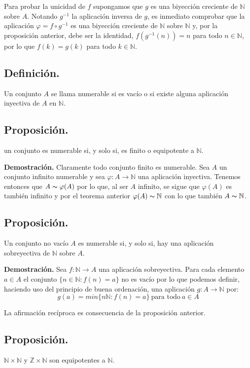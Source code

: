 \documentclass[10pt,a4paper]{article}
\begin{document}
	Para probar la unicidad de $f$ supongamos que $g$ es una biyección creciente de $\mathbb{N}$ sobre $A$. Notando $g^{-1}$ la aplicación inversa de $g$, es inmediato comprobar que la aplicación $\varphi = f \circ g^{-1}$ es una biyección creciente de $\mathbb{N}$ sobre $\mathbb{N}$ y, por la proposición anterior, debe ser la identidad, $f(g^{-1}(n)) = n$ para todo $n \in \mathbb{N}$, por lo que $f(k) = g(k)$ para todo $k \in \mathbb{N}$.
	
	\subsection{Definición.}
	Un conjunto $A$ se llama numerable si es vacío o si existe alguna aplicación inyectiva de $A$ en $\mathbb{N}$.
	
	\subsection{Proposición.}
	un conjunto es numerable si, y solo si, es finito o equipotente a $\mathbb{N}$.
	
	\textbf{Demostración.} Claramente todo conjunto finito es numerable. Sea $A$ un conjunto infinito numerable y sea $\varphi: A \rightarrow \mathbb{N}$ una aplicación inyectiva. Tenemos entonces que $A \thicksim \varphi(A)$ por lo que, al ser $A$ infinito, se sigue que $\varphi(A)$ es también infinito y por el teorema anterior $\varphi(A) \thicksim \mathbb{N}$ con lo que también $ A \thicksim \mathbb{N}$.
	
	\subsection{Proposición.}
	
	Un conjunto no vacío $A$ es numerable si, y solo si, hay una aplicación sobreyectiva de $\mathbb{N}$ sobre $A$.
	
	\textbf{Demostración.} Sea $f : \mathbb{N} \rightarrow A$ una aplicación sobreyectiva. Para cada elemento $a \in A$ el conjunto $\{n \in \mathbb{N} : f(n) = a\}$ no es vacío por lo que podemos definir, haciendo uso del principio de buena ordenación, una aplicación $g: A \rightarrow \mathbb{N}$ por: $$g(a) = min\{n \mathbb{N} : f(n) = a\} ~ \text{para todo} ~ a \in A$$
	
	La afirmación recíproca es consecuencia de la proposición anterior.
	
	\subsection{Proposición.}
	$\mathbb{N} \times \mathbb{N}$ y $\mathbb{Z} \times \mathbb{N}$ son equipotentes a $\mathbb{N}$.
	
\end{document}
